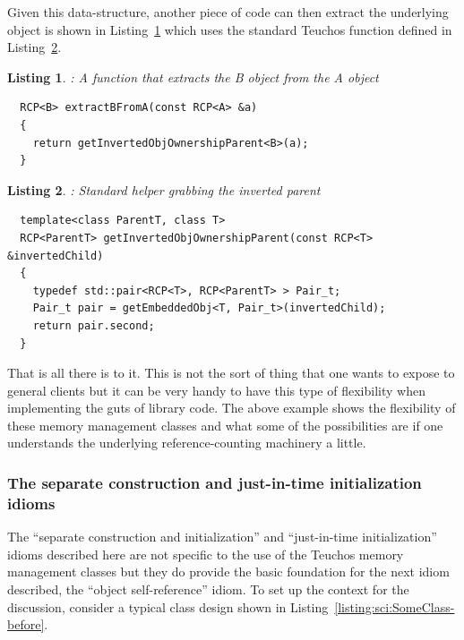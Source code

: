 \documentclass[pdf,ps2pdf,11pt]{SANDreport}
\newtheorem{listing}{Listing}
\begin{document}
Given this data-structure, another piece of code can then extract the
underlying {} object is shown in
Listing~\ref{listing:Extract_B_from_A} which uses the standard Teuchos
function {} defined in
Listing~\ref{listing:getInvertedObjOwnershipParent}.

\begin{listing}: A function that extracts the B object from the A object \\
\label{listing:Extract_B_from_A}
{\small\begin{verbatim}
  RCP<B> extractBFromA(const RCP<A> &a)
  {
    return getInvertedObjOwnershipParent<B>(a);
  }
\end{verbatim}}
\end{listing}


\begin{listing}: Standard helper grabbing the inverted parent \\
\label{listing:getInvertedObjOwnershipParent}
{\small\begin{verbatim}
  template<class ParentT, class T>
  RCP<ParentT> getInvertedObjOwnershipParent(const RCP<T> &invertedChild)
  {
    typedef std::pair<RCP<T>, RCP<ParentT> > Pair_t;
    Pair_t pair = getEmbeddedObj<T, Pair_t>(invertedChild);
    return pair.second;
  }
\end{verbatim}}
\end{listing}


That is all there is to it.  This is not the sort of thing that one
wants to expose to general clients but it can be very handy to have
this type of flexibility when implementing the guts of library code.
The above example shows the flexibility of these memory management
classes and what some of the possibilities are if one understands the
underlying reference-counting machinery a little.


%
{}\subsubsection{The separate construction and just-in-time
initialization idioms}
\label{sec:separate-construct-init}
%

The ``separate construction and initialization'' and ``just-in-time
initialization'' idioms described here are not specific to the use of
the Teuchos memory management classes but they do provide the basic
foundation for the next idiom described, the ``object self-reference''
idiom.  To set up the context for the discussion, consider a typical
class design shown in Listing~\ref{listing:sci:SomeClass-before}.
\end{document}
